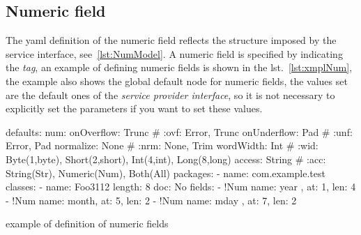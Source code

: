 \documentclass[a4paper,10pt]{report}
\newenvironment{elisting}[1][H]
  {\captionsetup{aboveskip=0pt}\begin{listing}[#1]}
  {\end{listing}%
}
\begin{document}
\subsection{Numeric field} \label{sub:yaml.num}
The yaml definition of the numeric field reflects the structure imposed by the 
service interface, see~\ref{lst:NumModel}. 
A numeric field is specified by indicating the  
 \textsl{tag}, an example of defining
numeric fields is shown in the lst.~\ref{lst:xmplNum}, the example also shows 
the global default node for numeric fields, the values set are the default ones 
of the \textsl{service provider interface}, so it is not necessary to explicitly 
set the parameters if you want to set these values.

\begin{elisting}[!htb]
\begin{yamlcode}
defaults:
  num:
    onOverflow: Trunc   # :ovf: Error, Trunc
    onUnderflow: Pad    # :unf: Error, Pad
    normalize: None     # :nrm: None, Trim
    wordWidth: Int      # :wid: Byte(1,byte), Short(2,short), Int(4,int), Long(8,long)
    access: String      # :acc: String(Str), Numeric(Num), Both(All)
packages:
  - name: com.example.test
    classes:
      - name: Foo3112
        length: 8
        doc: No
        fields:
          - !Num { name: year , at: 1, len: 4 }
          - !Num { name: month, at: 5, len: 2 }
          - !Num { name: mday , at: 7, len: 2 }
\end{yamlcode}
\caption{example of definition of numeric fields}
\label{lst:xmplNum}
\end{elisting}
\end{document}
